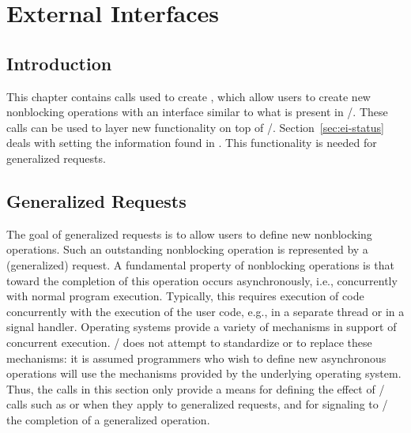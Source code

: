 
\chapter{External Interfaces}
\label{sec:ei-2}
\label{chap:ei-2}

\section{Introduction}
\label{sec:ei-intro}

This chapter
contains
calls used to
create ,
which allow users 
to create new nonblocking
operations with an interface similar to what is present in \mpi/.
These calls can be used to layer new functionality on top of \mpi/. 
Section~\ref{sec:ei-status} deals with setting the information found
in
.  
This functionality is needed for generalized 
requests.


\section{Generalized Requests}
\label{sec:ei-gr}

The goal of 
generalized requests 
is to allow users to define new
nonblocking operations.  Such an outstanding nonblocking operation is
represented by a (generalized) request.  A fundamental property of 
nonblocking operations is that 
toward the completion of this
operation occurs asynchronously, i.e., concurrently with normal program
execution.  Typically, this requires execution of code concurrently
with the execution of the user code, e.g., in a separate thread or in a
signal handler.  Operating systems provide a variety of mechanisms in
support of concurrent execution.
\MPI/ does not attempt to standardize or 
to replace these mechanisms: it is assumed
programmers who wish to define new asynchronous operations will use
the  mechanisms provided by the underlying operating system. 
Thus, the calls in this section only provide a means for
defining the effect of \MPI/ calls such as  or
 when they apply to generalized requests, and for
signaling to \MPI/ the completion of a generalized operation. 

